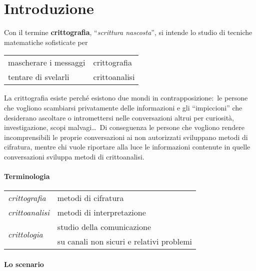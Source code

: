 \chapter{Introduzione}

Con il termine \textbf{crittografia}, ``\textit{scrittura nascosta}'', si intende lo studio di tecniche matematiche sofisticate per
\begin{table}[H]
    \centering
    \begin{tabular}{l l}
        mascherare i messaggi & crittografia  \\
        tentare di svelarli   & crittoanalisi \\
    \end{tabular}
\end{table}

\noindent La crittografia esiste perché esistono due mondi in contrapposizione:\ le persone che vogliono scambiarsi privatamente delle informazioni e gli ``impiccioni'' che desiderano ascoltare o intromettersi nelle conversazioni altrui per curiosità, investigazione, scopi malvagi\dots\
Di conseguenza le persone che vogliono rendere incomprensibili le proprie conversazioni ai non autorizzati sviluppano metodi di cifratura, mentre chi vuole riportare alla luce le informazioni contenute in quelle conversazioni sviluppa metodi di crittoanalisi.\

\subsubsection{Terminologia}

\begin{table}[H]
    \centering
    \begin{tabular}{|l|l|}
        \hline
        \textit{crittografia}                   & metodi di cifratura                      \\
        \textit{crittoanalisi}                  & metodi di interpretazione                \\
        \multirow{2}{4em}{\textit{crittologia}} & studio della comunicazione               \\
                                                & su canali non sicuri e relativi problemi \\\hline
    \end{tabular}
\end{table}

\subsubsection{Lo scenario}

